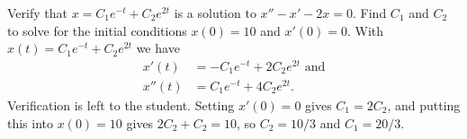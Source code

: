 {Verify that $x = C_1 e^{-t} + C_2 e^{2t}$ is a solution to $x'' - x' -2 x =
0$.  Find $C_1$ and $C_2$ to solve for the initial conditions $x(0) = 10$
and $x'(0) = 0$.}
{With $x(t) = C_1e^{-t}+C_2e^{2t}$ we have
\begin{align*}
x'(t) & = -C_1e^{-t}+2C_2e^{2t} \text{ and}\\
x''(t) & = C_1e^{-t}+4C_2e^{2t}.
\end{align*}
Verification is left to the student. Setting $x'(0)=0$ gives $C_1=2C_2$, and putting this into $x(0)=10$ gives $2C_2+C_2=10$, so $C_2=10/3$ and $C_1 = 20/3$.
}